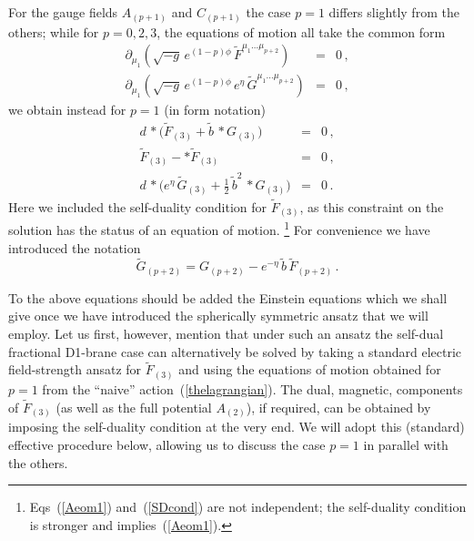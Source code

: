 \documentclass[a4paper,11pt]{article}
\newcommand{\eqref}[1]{(\ref{#1})}
\begin{document}
For the gauge fields $A_{(p+1)}$ and $C_{(p+1)}$ the case $p=1$
differs slightly from the others; while for $p=0,2,3$, the equations
of motion  all take the common form
%
\begin{eqnarray}
\label{Aeom}
\partial_{\mu_1} (\sqrt{-g} \, e^{(1-p)\phi} \,  \tilde{F}^{\mu_1
 \ldots \mu_{p+2}}) &=& 0\,, \\
%
\label{Ceom}
\partial_{\mu_1} ( \sqrt{-g} \, e^{(1-p)\phi} \,e^\eta \,
 \tilde{G}^{\mu_1 \ldots \mu_{p+2}} ) &=& 0 \,,
\end{eqnarray}
%
we obtain instead for $p=1$ (in form notation)
%
\begin{eqnarray}
\label{Aeom1}
d\,{*}\Big(\tilde{F}_{(3)}+\tilde{b}\,{*}G_{(3)}\Big) &=& 0 \,, \\[1ex]
%
\label{SDcond}
\tilde{F}_{(3)} - {*}\tilde{F}_{(3)} &=& 0 \,, \\[1ex]
\label{Ceom1}
d\,{*}\Big(e^\eta\,\tilde{G}_{(3)}+\frac{1}{2}\,
   \tilde{b}^2\,{*}G_{(3)}\Big) &=& 0 \,.
\end{eqnarray}
%
Here we included the self-duality condition for $\tilde{F}_{(3)}$, as
this constraint on the solution has the status of an equation of
motion.%
\footnote{Eqs~\eqref{Aeom1} and~\eqref{SDcond} are not independent;
the self-duality condition is stronger and implies~\eqref{Aeom1}.}
For convenience we have introduced the notation
%
\begin{equation}
\tilde{G}_{(p+2)} = G_{(p+2)}-
  e^{-\eta}\,\tilde{b}\,\tilde{F}_{(p+2)}\,.
\end{equation}

To the above equations should be added the Einstein equations which we
shall give once we have introduced the spherically symmetric ansatz
that we will employ. Let us first, however, mention that under such an
ansatz the self-dual fractional D1-brane case can alternatively be
solved by taking a standard electric field-strength ansatz for
$\tilde{F}_{(3)}$ and using the equations of motion obtained for
$p=1$ from the ``naive'' action~\eqref{thelagrangian}. The dual,
magnetic, components of $\tilde{F}_{(3)}$ (as well as the full
potential $A_{(2)}$), if required, can be obtained by imposing the
self-duality condition at the very end. We will adopt this (standard)
effective procedure below, allowing us to discuss the case $p=1$ in
parallel with the others.



\end{document}
